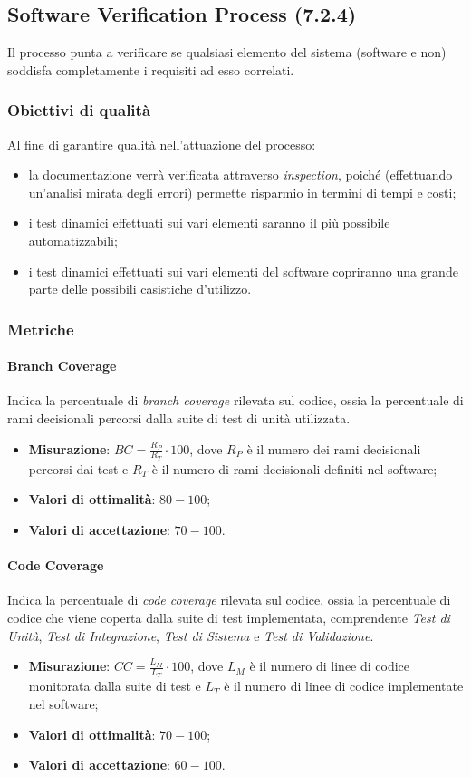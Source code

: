 \subsection{Software Verification Process (7.2.4)}
\label{soVerification}
Il processo punta a verificare se qualsiasi elemento del sistema (software e non) soddisfa completamente i requisiti ad esso correlati.
\subsubsection{Obiettivi di qualità}
Al fine di garantire qualità nell'attuazione del processo:
\begin{itemize}
\item la documentazione verrà verificata attraverso \textit{inspection}, poiché (effettuando un'analisi mirata degli errori) permette risparmio in termini di tempi e costi;
\item i test dinamici effettuati sui vari elementi saranno il più possibile automatizzabili;
\item i test dinamici effettuati sui vari elementi del software copriranno una grande parte delle possibili casistiche d'utilizzo.
\end{itemize}
\subsubsection{Metriche}
\paragraph{Branch Coverage}
\label{coperturaTest}
Indica la percentuale di \textit{branch coverage} rilevata sul codice, ossia la percentuale di rami decisionali percorsi dalla suite di test di unità utilizzata.
\begin{itemize}
\item \textbf{Misurazione}: $BC=\frac{R_{P}}{R_{T}} \cdot 100$, dove $R_{P}$ è il numero dei rami decisionali percorsi dai test e $R_{T}$ è il numero di rami decisionali definiti nel software;
\item \textbf{Valori di ottimalità}: $80 - 100$;
\item \textbf{Valori di accettazione}: $70 - 100$.
\end{itemize}
\paragraph{Code Coverage}
\label{codeCoverage}
Indica la percentuale di \textit{code coverage} rilevata sul codice, ossia la percentuale di codice che viene coperta dalla suite di test implementata, comprendente \textit{Test di Unità}, \textit{Test di Integrazione}, \textit{Test di Sistema} e \textit{Test di Validazione}.
\begin{itemize}
\item \textbf{Misurazione}: $CC=\frac{L_{M}}{L_{T}} \cdot 100$, dove $L_{M}$ è il numero di linee di codice monitorata dalla suite di test e $L_{T}$ è il numero di linee di codice implementate nel software;
\item \textbf{Valori di ottimalità}: $70 - 100$;
\item \textbf{Valori di accettazione}: $60 - 100$.
\end{itemize}
